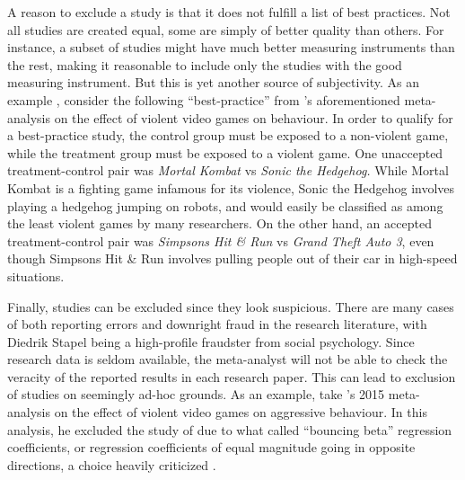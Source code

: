 A reason to exclude a study is that it does not fulfill a list of best practices. Not all studies are created equal, some are simply of better quality than others. For instance, a subset of studies might have much better measuring instruments than the rest, making it reasonable to include only the studies with the good measuring instrument. But this is yet another source of subjectivity. As an example \parencite[][p. 6]{lakens_reproducibility_2016}, consider the following ``best-practice'' from \textcite{Anderson2010-ki}'s aforementioned meta-analysis on the effect of violent video games  on behaviour. In order to qualify for a best-practice study, the control group must be exposed to a non-violent game, while the treatment group must be exposed to a violent game. One unaccepted treatment-control pair was \emph{Mortal Kombat} vs \emph{Sonic the Hedgehog.} While Mortal Kombat is a fighting game infamous for its violence, Sonic the Hedgehog involves playing a hedgehog jumping on robots, and would easily be classified as among the least violent games by many researchers. On the other hand, an accepted treatment-control pair was \emph{Simpsons Hit \& Run} vs \emph{Grand Theft Auto 3}, even though Simpsons Hit \& Run involves pulling people out of their car in high-speed situations. 

Finally, studies can be excluded since they look suspicious. There are many cases of both reporting errors  and downright fraud in the research literature, with Diedrik Stapel being a high-profile fraudster from social psychology. Since research data is seldom available, the meta-analyst will not be able to check the veracity of the reported results in each research paper. This can lead to exclusion of studies on seemingly ad-hoc grounds. As an example, take \citeauthor{ferguson_angry_2015}'s 2015 meta-analysis on the effect of violent video games on aggressive behaviour. In this analysis, he excluded the study of \textcite{gentile_effects_2009} due to what \textcite{ferguson_angry_2015} called ``bouncing beta'' regression coefficients, or regression coefficients of equal magnitude going in opposite directions, a choice heavily criticized \textcite{gentile_what_2015}.


